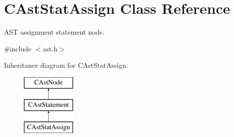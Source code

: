 \hypertarget{classCAstStatAssign}{\section{C\-Ast\-Stat\-Assign Class Reference}
\label{classCAstStatAssign}
}


A\-S\-T assignment statement node.  




{\ttfamily \#include $<$ast.\-h$>$}

Inheritance diagram for C\-Ast\-Stat\-Assign\-:\begin{figure}[H]
\begin{center}
\leavevmode
\includegraphics[height=3.000000cm]{classCAstStatAssign}
\end{center}
\end{figure}
